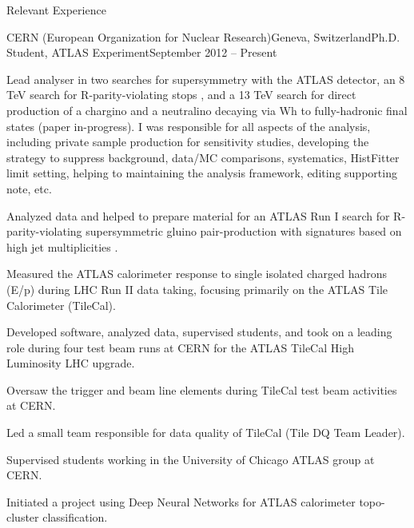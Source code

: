 \documentclass{resume}
\begin{document}

\begin{rsection}{Relevant Experience}

  \begin{rsubsection}{CERN (European Organization for Nuclear Research)}{Geneva, Switzerland}{Ph.D. Student, ATLAS Experiment}{September 2012 -- Present}
  \item Lead analyser in two searches for supersymmetry with the ATLAS detector, an 8 TeV search for R-parity-violating stops \cite{RPVstop2016}, and a 13 TeV search for direct production of a chargino and a neutralino decaying via Wh to fully-hadronic final states (paper in-progress). I was responsible for all aspects of the analysis, including private sample production for sensitivity studies, developing the strategy to suppress background, data/MC comparisons, systematics, HistFitter limit setting, helping to maintaining the analysis framework, editing supporting note, etc.
  \item Analyzed data and helped to prepare material for an ATLAS Run I search for R-parity-violating supersymmetric gluino pair-production with signatures based on high jet multiplicities \cite{Multijet2015}. 
  \item Measured the ATLAS calorimeter response to single isolated charged hadrons (E/p) during LHC Run II data taking, focusing primarily on the ATLAS Tile Calorimeter (TileCal).
  \item Developed software, analyzed data, supervised students, and took on a leading role during four test beam runs at CERN for the ATLAS TileCal High Luminosity LHC upgrade.
  \item Oversaw the trigger and beam line elements during TileCal test beam activities at CERN. 
  \item Led a small team responsible for data quality of TileCal (Tile DQ Team Leader).
  \item Supervised students working in the University of Chicago ATLAS group at CERN.
  \item Initiated a project using Deep Neural Networks for ATLAS calorimeter topo-cluster classification.
  \end{rsubsection}



\end{rsection}
\end{document}
